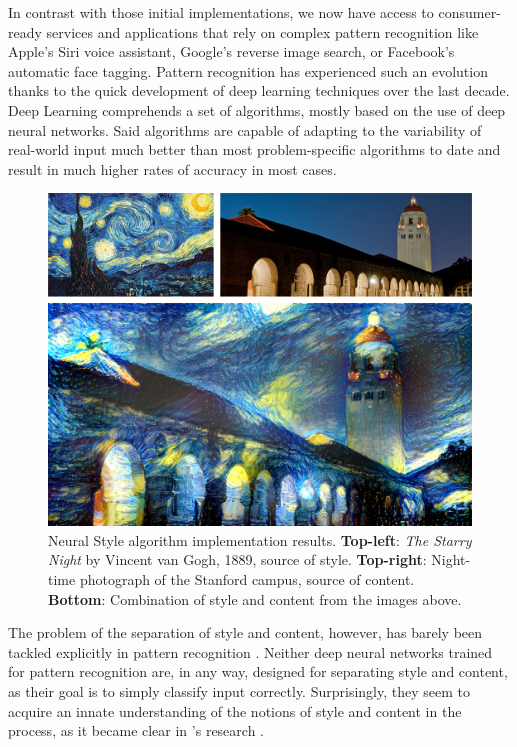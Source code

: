 In contrast with those initial implementations, we now have access to consumer-ready services and applications that rely on complex pattern recognition like Apple's Siri voice assistant, Google's reverse image search, or Facebook's automatic face tagging.
Pattern recognition has experienced such an evolution thanks to the quick development of deep learning techniques over the last decade.
Deep Learning comprehends a set of algorithms, mostly based on the use of deep neural networks.
Said algorithms are capable of adapting to the variability of real-world input much better than most problem-specific algorithms to date and result in much higher rates of accuracy in most cases.

\begin{figure}[t]
  \includegraphics[width=\textwidth]{gfx/neural-style-composed}
  \caption{
  Neural Style algorithm implementation \cite{Johnson2015} results.
  \textbf{Top-left}: \textit{The Starry Night} by Vincent van Gogh, 1889, source of style.
  \textbf{Top-right}: Night-time photograph of the Stanford campus, source of content.
  \textbf{Bottom}: Combination of style and content from the images above.
  }
  \label{fig:sec:intro:neural-style}
\end{figure}

The problem of the separation of style and content, however, has barely been tackled explicitly in pattern recognition \cite{Karayev2014}.
Neither deep neural networks trained for pattern recognition are, in any way, designed for separating style and content, as their goal is to simply classify input correctly.
Surprisingly, they seem to acquire an innate understanding of the notions of style and content in the process, as it became clear in \citeauthor{Gatys2015B}'s research \cite{Gatys2015B}.

